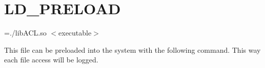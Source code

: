 \hypertarget{LD_PRELOAD-example}{}\section{L\+D\+\_\+\+P\+R\+E\+L\+O\+AD}
=./lib\+A\+CL.so $<$executable$>$

This file can be preloaded into the system with the following command. This way each file access will be logged.


\begin{DoxyCodeInclude}
\end{DoxyCodeInclude}
 